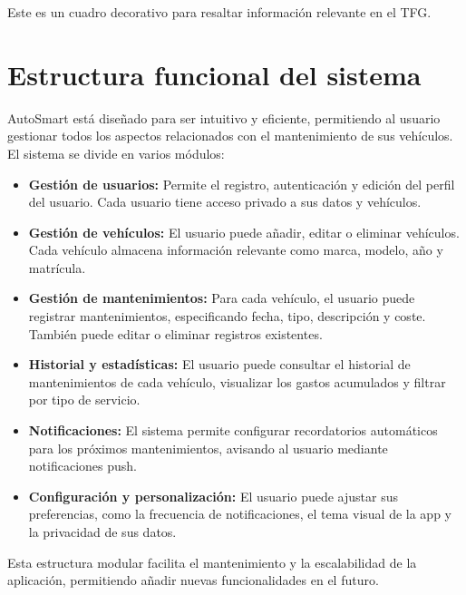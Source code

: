 \documentclass[12pt,a4paper]{book}
\begin{document}
\begin{tcolorbox}[highlightbox, title={Nota importante}]
Este es un cuadro decorativo para resaltar información relevante en el TFG.
\end{tcolorbox}


\section{Estructura funcional del sistema}
AutoSmart está diseñado para ser intuitivo y eficiente, permitiendo al usuario gestionar todos los aspectos relacionados con el mantenimiento de sus vehículos. El sistema se divide en varios módulos:

\begin{itemize}
    \item \textbf{Gestión de usuarios:} Permite el registro, autenticación y edición del perfil del usuario. Cada usuario tiene acceso privado a sus datos y vehículos.
    \item \textbf{Gestión de vehículos:} El usuario puede añadir, editar o eliminar vehículos. Cada vehículo almacena información relevante como marca, modelo, año y matrícula.
    \item \textbf{Gestión de mantenimientos:} Para cada vehículo, el usuario puede registrar mantenimientos, especificando fecha, tipo, descripción y coste. También puede editar o eliminar registros existentes.
    \item \textbf{Historial y estadísticas:} El usuario puede consultar el historial de mantenimientos de cada vehículo, visualizar los gastos acumulados y filtrar por tipo de servicio.
    \item \textbf{Notificaciones:} El sistema permite configurar recordatorios automáticos para los próximos mantenimientos, avisando al usuario mediante notificaciones push.
    \item \textbf{Configuración y personalización:} El usuario puede ajustar sus preferencias, como la frecuencia de notificaciones, el tema visual de la app y la privacidad de sus datos.
\end{itemize}

Esta estructura modular facilita el mantenimiento y la escalabilidad de la aplicación, permitiendo añadir nuevas funcionalidades en el futuro. 
\end{document}
